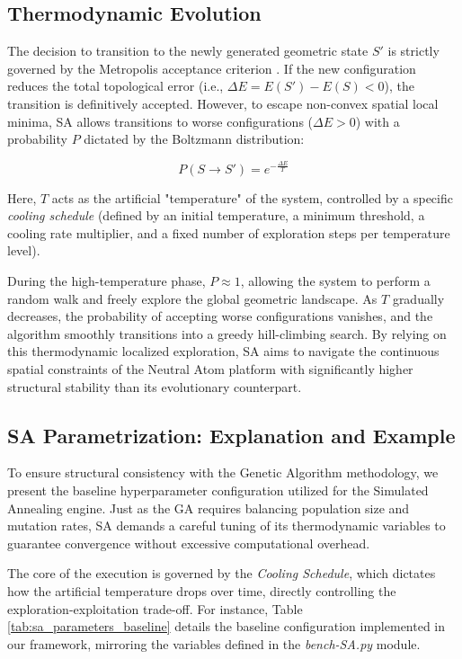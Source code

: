 \subsection{Thermodynamic Evolution}

The decision to transition to the newly generated geometric state $S'$ is strictly governed by the Metropolis acceptance criterion \cite{metropolis1953equation}. If the new configuration reduces the total topological error (i.e., $\Delta E = E(S') - E(S) < 0$), the transition is definitively accepted. However, to escape non-convex spatial local minima, SA allows transitions to worse configurations ($\Delta E > 0$) with a probability $P$ dictated by the Boltzmann distribution:

$$P(S \rightarrow S') = e^{-\frac{\Delta E}{T}}$$

Here, $T$ acts as the artificial "temperature" of the system, controlled by a specific \textit{cooling schedule} (defined by an initial temperature, a minimum threshold, a cooling rate multiplier, and a fixed number of exploration steps per temperature level). 

During the high-temperature phase, $P \approx 1$, allowing the system to perform a random walk and freely explore the global geometric landscape. As $T$ gradually decreases, the probability of accepting worse configurations vanishes, and the algorithm smoothly transitions into a greedy hill-climbing search. By relying on this thermodynamic localized exploration, SA aims to navigate the continuous spatial constraints of the Neutral Atom platform with significantly higher structural stability than its evolutionary counterpart.

\subsection{SA Parametrization: Explanation and Example}

To ensure structural consistency with the Genetic Algorithm methodology, we present the baseline hyperparameter configuration utilized for the Simulated Annealing engine. Just as the GA requires balancing population size and mutation rates, SA demands a careful tuning of its thermodynamic variables to guarantee convergence without excessive computational overhead. 

The core of the execution is governed by the \textit{Cooling Schedule}, which dictates how the artificial temperature drops over time, directly controlling the exploration-exploitation trade-off. For instance, Table \ref{tab:sa_parameters_baseline} details the baseline configuration implemented in our framework, mirroring the variables defined in the \textit{bench-SA.py} module.

